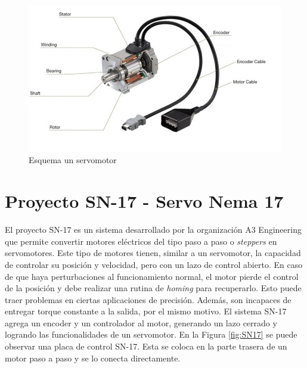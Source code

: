 \begin{figure}[htbp]
	\centering
	\includegraphics[scale=0.6]{./Figures/servomotor.jpg}
	\caption{Esquema un servomotor\protect\footnotemark}
	\label{fig:servomotor}
\end{figure}



\section{Proyecto SN-17 - Servo Nema 17}

El proyecto SN-17 es un sistema desarrollado por la organización A3 Engineering que permite convertir motores eléctricos del tipo paso a paso o \textit{steppers} en servomotores. Este tipo de motores tienen, similar a un servomotor, la capacidad de controlar su posición y velocidad, pero con un lazo de control abierto. En caso de que haya perturbaciones al funcionamiento normal, el motor pierde el control de la posición y debe realizar una rutina de \textit{homing} para recuperarlo. Esto puede traer problemas en ciertas aplicaciones de precisión. Además, son incapaces de entregar torque constante a la salida, por el mismo motivo. El sistema SN-17 agrega un encoder y un controlador al motor, generando un lazo cerrado y logrando las funcionalidades de un servomotor. En la Figura \ref{fig:SN17} se puede observar una placa de control SN-17. Esta se coloca en la parte trasera de un motor paso a paso y se lo conecta directamente.

